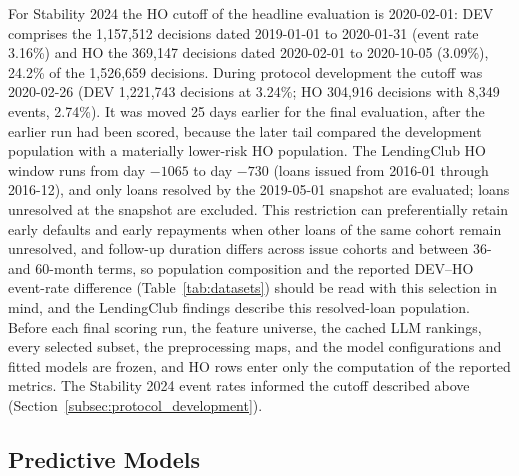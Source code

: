 \documentclass[final,5p,twocolumn]{elsarticle}
\begin{document}
For Stability 2024 the HO cutoff of the headline evaluation is 2020-02-01: DEV comprises the 1,157,512 decisions dated 2019-01-01 to 2020-01-31 (event rate 3.16\%) and HO the 369,147 decisions dated 2020-02-01 to 2020-10-05 (3.09\%), 24.2\% of the 1,526,659 decisions. During protocol development the cutoff was 2020-02-26 (DEV 1,221,743 decisions at 3.24\%; HO 304,916 decisions with 8,349 events, 2.74\%). It was moved 25 days earlier for the final evaluation, after the earlier run had been scored, because the later tail compared the development population with a materially lower-risk HO population. The LendingClub HO window runs from day $-1065$ to day $-730$ (loans issued from 2016-01 through 2016-12), and only loans resolved by the 2019-05-01 snapshot are evaluated; loans unresolved at the snapshot are excluded. This restriction can preferentially retain early defaults and early repayments when other loans of the same cohort remain unresolved, and follow-up duration differs across issue cohorts and between 36- and 60-month terms, so population composition and the reported DEV--HO event-rate difference (Table~\ref{tab:datasets}) should be read with this selection in mind, and the LendingClub findings describe this resolved-loan population. Before each final scoring run, the feature universe, the cached LLM rankings, every selected subset, the preprocessing maps, and the model configurations and fitted models are frozen, and HO rows enter only the computation of the reported metrics. The Stability 2024 event rates informed the cutoff described above (Section~\ref{subsec:protocol_development}).

\subsection{Predictive Models}
\label{subsec:models}
\end{document}
